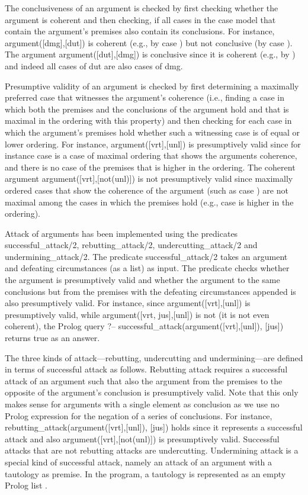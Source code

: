 \documentclass{IOS-Book-Article}
\begin{document}
The conclusiveness of an argument is checked by first checking whether the argument is coherent and then checking, if all cases in the case model that contain the argument's premises also contain its conclusions. For instance, {\mf argument([dmg],[dut])} is coherent (e.g., by case {}) but not conclusive (by case {}). The argument {\mf argument([dut],[dmg])} is conclusive since it is coherent (e.g., by {}) and indeed all cases of {\mf dut} are also cases of {\mf dmg}.

Presumptive validity of an argument is checked by first determining a maximally preferred case that witnesses the argument's coherence (i.e., finding a case in which both the premises and the conclusions of the argument hold and that is maximal in the ordering with this property) and then checking for each case in which the argument's premises hold whether such a witnessing case is of equal or lower ordering. For instance, {\mf argument([vrt],[unl])} is presumptively valid since for instance case {} is a case of maximal ordering that shows the arguments coherence, and there is no case of the premises that is higher in the ordering. The coherent argument {\mf argument([vrt],[not(unl)])} is not presumptively valid since maximally ordered cases that show the coherence of the argument (such as case {}) are not maximal among the cases in which the premises hold (e.g., case {} is higher in the ordering).

Attack of arguments has been implemented using the predicates {\mf successful\_attack/2}, {\mf rebutting\_attack/2}, {\mf undercutting\_attack/2} and {\mf undermining\_attack/2}. The predicate {\mf successful\_attack/2} takes an argument and defeating circumstances (as a list) as input. The predicate checks whether the argument is presumptively valid and whether the argument to the same conclusions but from the premises with the defeating circumstances appended is also presumptively valid. For instance, since {\mf argument([vrt],[unl])} is presumptively valid, while {\mf argument([vrt, jus],[unl])} is not (it is not even coherent), the Prolog query {\mf ?-- successful\_attack(argument([vrt],[unl]), [jus])} returns {\mf true} as an answer.

The three kinds of attack---rebutting, undercutting and undermining---are defined in terms of successful attack as follows. Rebutting attack requires a successful attack of an argument such that also the argument from the premises to the opposite of the argument's conclusion is presumptively valid. Note that this only makes sense for arguments with a single element as conclusion as we use no Prolog expression for the negation of a series of conclusions. For instance, {\mf rebutting\_attack(argument([vrt],[unl]), [jus])} holds since it represents a successful attack and also {\mf argument([vrt],[not(unl)])} is presumptively valid. Successful attacks that are not rebutting attacks are undercutting. Undermining attack is a special kind of successful attack, namely an attack of an argument with a tautology as premise. In the program, a tautology is represented as an empty Prolog list {\mf [ ]}.
\end{document}
